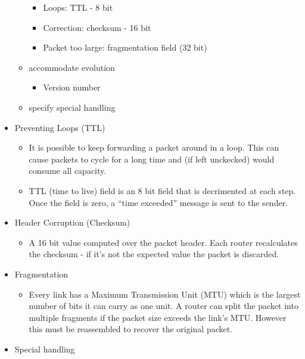 \begin{itemize}
\begin{itemize}
    \begin{itemize}
    \tightlist
    \item
      Loops: TTL - 8 bit
    \item
      Correction: checksum - 16 bit
    \item
      Packet too large: fragmentation field (32 bit)
    \end{itemize}
  \item
    accommodate evolution

    \begin{itemize}
    \tightlist
    \item
      Version number
    \end{itemize}
  \item
    specify special handling
  \end{itemize}
\item
  Preventing Loops (TTL)

  \begin{itemize}
  \tightlist
  \item
    It is possible to keep forwarding a packet around in a loop. This
    can cause packets to cycle for a long time and (if left unckecked)
    would consume all capacity.
  \item
    TTL (time to live) field is an 8 bit field that is decrimented at
    each step. Once the field is zero, a ``time exceeded'' message is
    sent to the sender.
  \end{itemize}
\item
  Header Corruption (Checksum)

  \begin{itemize}
  \tightlist
  \item
    A 16 bit value computed over the packet header. Each router
    recalculates the checksum - if it's not the expected value the
    packet is discarded.
  \end{itemize}
\item
  Fragmentation

  \begin{itemize}
  \tightlist
  \item
    Every link has a Maximum Transmission Unit (MTU) which is the
    largest number of bits it can carry as one unit. A router can split
    the packet into multiple fragments if the packet size exceeds the
    link's MTU. However this must be reassembled to recover the original
    packet.
  \end{itemize}
\item
  Special handling


\end{itemize}
